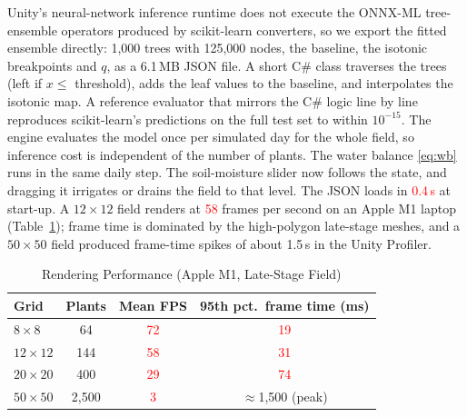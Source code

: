 \documentclass[conference]{IEEEtran}
\newcommand{\ph}[1]{\textcolor{red}{#1}}
\begin{document}
Unity's neural-network inference runtime does not execute the ONNX-ML tree-ensemble operators
produced by scikit-learn converters, so we export the fitted ensemble directly: 1{,}000 trees with
125{,}000 nodes, the baseline, the isotonic breakpoints and $q$, as a 6.1\,MB JSON file.
A short C\# class traverses the trees (left if $x \le$ threshold), adds the leaf values to the
baseline, and interpolates the isotonic map. A reference evaluator that mirrors the C\# logic
line by line reproduces scikit-learn's predictions on the full test set to within
$10^{-15}$. The engine evaluates the model once per simulated day for the whole field, so
inference cost is independent of the number of plants. The water balance \eqref{eq:wb} runs in
the same daily step. The soil-moisture slider now follows the state, and dragging it irrigates
or drains the field to that level. The JSON loads in \ph{0.4\,s} at start-up. A $12 \times 12$
field renders at \ph{58} frames per second on an Apple M1 laptop (Table~\ref{tab:perf}); frame time
is dominated by the high-polygon late-stage meshes, and a $50 \times 50$ field produced
frame-time spikes of about 1.5\,s in the Unity Profiler.

\begin{table}[t]
\centering
\caption{Rendering Performance (Apple M1, Late-Stage Field)}
\label{tab:perf}
\footnotesize
\begin{tabular}{@{}lccc@{}}
\toprule
Grid & Plants & Mean FPS & 95th pct.\ frame time (ms) \\
\midrule
$8 \times 8$   & 64      & \ph{72} & \ph{19} \\
$12 \times 12$ & 144     & \ph{58} & \ph{31} \\
$20 \times 20$ & 400     & \ph{29} & \ph{74} \\
$50 \times 50$ & 2{,}500 & \ph{3}  & $\approx$1{,}500 (peak) \\
\bottomrule
\end{tabular}
\end{table}
\end{document}
